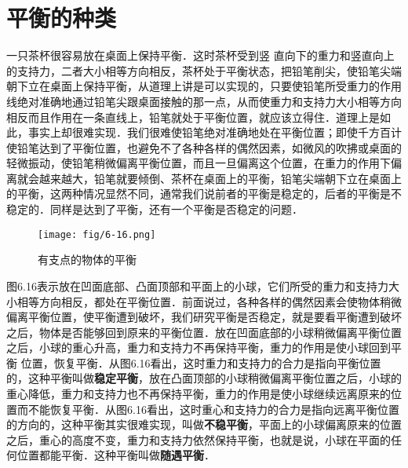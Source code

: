 \section{平衡的种类}
一只茶杯很容易放在桌面上保持平衡．这时茶杯受到竖
直向下的重力和竖直向上的支持力，二者大小相等方向相反，茶杯处于平衡状态，把铅笔削尖，使铅笔尖端朝下立在桌面上保持平衡，从道理上讲是可以实现的，只要使铅笔所受重力的作用线绝对准确地通过铅笔尖跟桌面接触的那一点，从而使重力和支持力大小相等方向相反而且作用在一条直线上，铅笔就处于平衡位置，就应该立得住．道理上是如此，事实上却很难实现．我们很难使铅笔绝对准确地处在平衡位置；即使千方百计使铅笔达到了平衡位置，也避免不了各种各样的偶然因素，如微风的吹拂或桌面的轻微振动，使铅笔稍微偏离平衡位置，而且一旦偏离这个位置，在重力的作用下偏离就会越来越大，铅笔就要倾倒、茶杯在桌面上的平衡，铅笔尖端朝下立在桌面上的平衡，这两种情况显然不同，通常我们说前者的平衡是稳定的，后者的平衡是不稳定的．同样是达到了平衡，还有一个平衡是否稳定的问题．
\begin{figure}[htp]
\centering\texttt{[image: fig/6-16.png]}
\caption{有支点的物体的平衡}
\end{figure}

图6.16表示放在凹面底部、凸面顶部和平面上的小球，它们所受的重力和支持力大小相等方向相反，都处在平衡位置．前面说过，各种各样的偶然因素会使物体稍微偏离平衡位置，使平衡遭到破坏，我们研究平衡是否稳定，就是要看平衡遭到破坏之后，物体是否能够回到原来的平衡位置．放在凹面底部的小球稍微偏离平衡位置之后，小球的重心升高，重力和支持力不再保持平衡，重力的作用是使小球回到平衡
位置，恢复平衡．从图6.16看出，这时重力和支持力的合力是指向平衡位置的，这种平衡叫做\textbf{稳定平衡}，放在凸面顶部的小球稍微偏离平衡位置之后，小球的重心降低，重力和支持力也不再保持平衡，重力的作用是使小球继续远离原来的位置而不能恢复平衡．从图6.16看出，这时重心和支持力的合力是指向远离平衡位置的方向的，这种平衡其实很难实现，叫做\textbf{不稳平衡}，平面上的小球偏离原来的位置之后，重心的高度不变，重力和支持力依然保持平衡，也就是说，小球在平面的任何位置都能平衡．这种平衡叫做\textbf{随遇平衡}．

